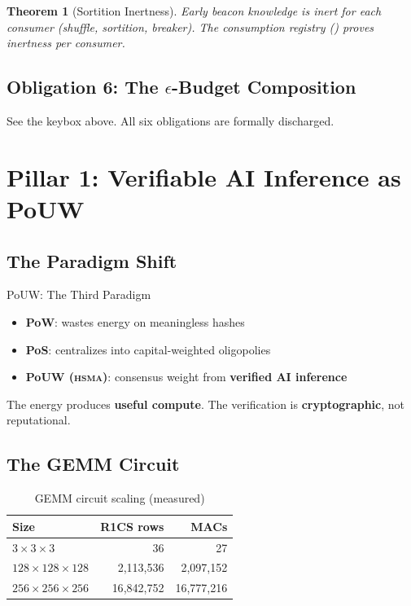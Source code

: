 \documentclass[11pt, a4paper]{article}
\newtheorem{theorem}{Theorem}
\newcommand{\hsma}{\textsc{hsma}}
\begin{document}
\begin{theorem}[Sortition Inertness]
Early beacon knowledge is inert for each consumer (shuffle, sortition,
breaker). The consumption registry () proves inertness per
consumer.
\end{theorem}

\subsection{Obligation 6: The $\epsilon$-Budget Composition}

See the keybox above. All six obligations are formally discharged.

\section{Pillar 1: Verifiable AI Inference as PoUW}
\label{sec:pouw}

\subsection{The Paradigm Shift}

\begin{defnbox}{PoUW: The Third Paradigm}
\begin{itemize}
\item \textbf{PoW}: wastes energy on meaningless hashes
\item \textbf{PoS}: centralizes into capital-weighted oligopolies
\item \textbf{PoUW (\hsma{})}: consensus weight from \textbf{verified AI inference}
\end{itemize}
The energy produces \textbf{useful compute}. The verification is
\textbf{cryptographic}, not reputational.
\end{defnbox}

\subsection{The GEMM Circuit}

\begin{table}[h]
\centering
{}
\begin{tabular}{lrr}
\rowcolor{hsmaBlue!20} \textbf{Size} & \textbf{R1CS rows} & \textbf{MACs} \\
\midrule
 $3 \times 3 \times 3$ & 36 & 27 \\
 $128 \times 128 \times 128$ & 2{,}113{,}536 & 2{,}097{,}152 \\
 $256 \times 256 \times 256$ & 16{,}842{,}752 & 16{,}777{,}216 \\
\bottomrule
\end{tabular}
\caption{GEMM circuit scaling (measured)}
\end{table}
\end{document}
